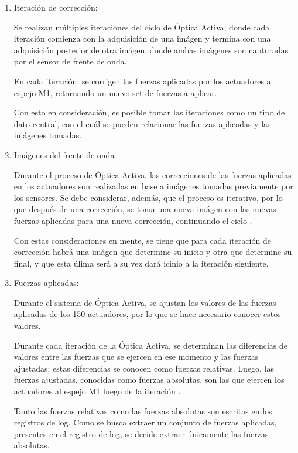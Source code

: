 \begin{enumerate}
    \item Iteración de corrección:

    Se realizan múltiples iteraciones del ciclo de Óptica Activa, donde cada iteración comienza con la adquisición de una imágen y termina con una adquisición posterior de otra imágen, donde ambas imágenes son capturadas por el sensor de frente de onda.
    
    En cada iteración, se corrigen las fuerzas aplicadas por los actuadores al espejo M1, retornando un nuevo set de fuerzas a aplicar. 
    
    Con esto en consideración, es posible tomar las iteraciones como un tipo de dato central, con el cuál se pueden relacionar las fuerzas aplicadas y las imágenes tomadas.

    \item Imágenes del frente de onda

    Durante el proceso de Óptica Activa, las correcciones de las fuerzas aplicadas en los actuadores son realizadas en base a imágenes tomadas previamente por los sensores. Se debe considerar, además, que el proceso es iterativo, por lo que después de una corrección, se toma una nueva imágen con las nuevas fuerzas aplicadas para una nueva corrección, continuando el ciclo \cite{eso1998vlt}.
    
    Con estas consideraciones en mente, se tiene que para cada iteración de corrección habrá una imágen que determine su inicio y otra que determine su final, y que esta úlima será a su vez dará icinio a la iteración siguiente.

    \item Fuerzas aplicadas:

    Durante el sistema de Óptica Activa, se ajustan los valores de las fuerzas aplicadas de los 150 actuadores, por lo que se hace necesario conocer estos valores\cite{eso1998vlt}. 

    Durante cada iteración de la Óptica Activa, se determinan las diferencias de valores entre las fuerzas que se ejercen en ese momento y las fuerzas ajustadas; estas diferencias se conocen como fuerzas relativas. Luego, las fuerzas ajustadas, conocidas como fuerzas absolutas, son las que ejercen los actuadores al espejo M1 luego de la iteración \cite{wilson1987active}.
    
    Tanto las fuerzas relativas como las fuerzas absolutas son escritas en los registros de log. Como se busca extraer un conjunto de fuerzas aplicadas, presentes en el registro de log, se decide extraer únicamente las fuerzas absolutas.
    

\end{enumerate}
